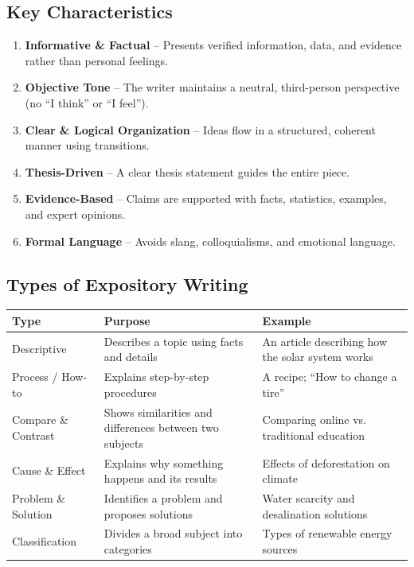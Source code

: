 \documentclass[12pt,a4paper]{article}
\begin{document}
\subsection{Key Characteristics}

\begin{enumerate}[noitemsep]
    \item \textbf{Informative \& Factual} -- Presents verified information, data, and evidence rather than personal feelings.
    \item \textbf{Objective Tone} -- The writer maintains a neutral, third-person perspective (no ``I think'' or ``I feel'').
    \item \textbf{Clear \& Logical Organization} -- Ideas flow in a structured, coherent manner using transitions.
    \item \textbf{Thesis-Driven} -- A clear thesis statement guides the entire piece.
    \item \textbf{Evidence-Based} -- Claims are supported with facts, statistics, examples, and expert opinions.
    \item \textbf{Formal Language} -- Avoids slang, colloquialisms, and emotional language.
\end{enumerate}

\subsection{Types of Expository Writing}

\begin{center}
\begin{tabular}{p{3.5cm}p{5cm}p{5cm}}
\toprule
\textbf{Type} & \textbf{Purpose} & \textbf{Example} \\
\midrule
Descriptive & Describes a topic using facts and details & An article describing how the solar system works \\
\addlinespace
Process / How-to & Explains step-by-step procedures & A recipe; ``How to change a tire'' \\
\addlinespace
Compare \& Contrast & Shows similarities and differences between two subjects & Comparing online vs. traditional education \\
\addlinespace
Cause \& Effect & Explains why something happens and its results & Effects of deforestation on climate \\
\addlinespace
Problem \& Solution & Identifies a problem and proposes solutions & Water scarcity and desalination solutions \\
\addlinespace
Classification & Divides a broad subject into categories & Types of renewable energy sources \\
\bottomrule
\end{tabular}
\end{center}
\end{document}
